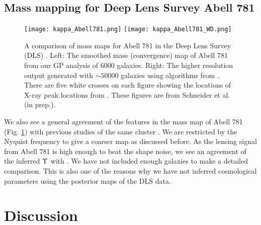 \subsection{Mass mapping for Deep Lens Survey Abell 781}
\begin{figure}[h!]
	\centering
	\texttt{[image: kappa\_Abell781.png]}
	\texttt{[image: kappa\_Abell781\_WD.png]}
	\caption{A comparison of mass maps for Abell 781 in the Deep Lens Survey (DLS) 
		\label{fig:Abell781_massmap}.  Left: The smoothed mass (convergence) map of Abell 781 from 
		our GP analysis of 6000 galaxies.
		Right: The higher resolution output generated with $\sim 50000$ galaxies using 
		algorithms from \cite{Wittman2014}. 
		There are five white crosses on each figure showing the locations of X-ray
		peak locations from \cite{Sehgal2008}. 
	These figures are from Schneider et al. (in prep.).
}
\end{figure}
We also see a general agreement of the features in the mass map of Abell 781
(Fig. \ref{fig:Abell781_massmap}) with previous studies of the same cluster 
\citep{Wittman2014}.  
We are restricted by the Nyquist frequency to give a coarser map as discussed
before.   
As the lensing signal from Abell 781 is high enough to beat the shape noise, 
we see an agreement of the inferred $\Upsilon$ with \cite{Wittman2014}. 
We have not included enough galaxies to make a detailed comparison. 
This is also one of the reasons why  we
 have not inferred cosmological parameters using the
posterior maps of the DLS data.



\section{Discussion}

